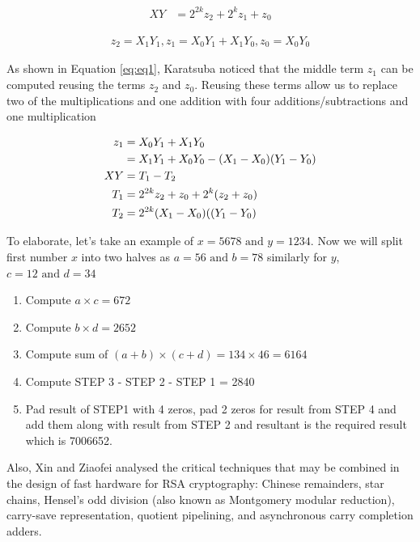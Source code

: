 \documentclass[12pt,journal,compsoc]{IEEEtran}
\begin{document}
\begin{align}
\label{eq:eq0}
XY &= 2^{2k}z_{2} + 2^{k}z_{1} + z_{0}
\end{align}

\begin{align}
\label{eq:eq1}
z_2 = X_{1}Y_{1}, z_{1} = X_{0}Y_{1} + X_{1}Y_{0}, z_{0} = X_{0}Y_{0}
\end{align}

As shown in Equation \ref{eq:eq1}, Karatsuba\cite{karatsuba} noticed that the middle term $z_1$ can be computed reusing the terms $z_2$ and $z_0$. Reusing these terms allow us to  replace two of the multiplications and one addition with four additions/subtractions and one multiplication

\begin{align}
z_{1} &=  X_{0}Y_{1} + X_{1}Y_{0} \notag\\
&=  X_{1}Y_{1} + X_{0}Y_{0} - (X_{1} - X_{0})(Y_{1} - Y_{0}) \notag\\
XY &= T_{1} - T_{2} \notag \\
T_{1} &= 2^{2k}z_{2} + z_{0} + 2^{k}(z_{2} + z_{0}) \notag \\
T_{2} &= 2^{2k}(X_{1} - X_{0})((Y_{1}-Y_{0})
\label{eq:eq2}
\end{align}


To elaborate, let's take an example of $x = 5678 \text{ and } y = 1234$. Now we will split first number $x$ into two halves as $a=56 \text{ and }b=78$ similarly for $y$, $c=12 \text{ and } d=34$

\begin{enumerate}[ {STEP }1{:} ]
	\item Compute $a \times c = 672$
	\item Compute $b \times d = 2652$
	\item Compute sum of $(a + b)\times (c +d) = 134 \times 46 = 6164$
	\item Compute STEP 3 - STEP 2 - STEP 1 = 2840
	\item Pad result of STEP1 with 4 zeros, pad 2 zeros for result from STEP 4 and add them along with result from STEP 2 and resultant is the required result which is 7006652.
\end{enumerate}

Also, Xin  and Ziaofei\cite{378085} analysed the critical techniques that may be combined in the design of fast hardware for RSA cryptography: Chinese remainders, star chains, Hensel's odd division (also known as Montgomery modular reduction), carry-save representation, quotient pipelining, and asynchronous carry completion adders.
\end{document}
